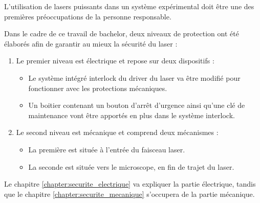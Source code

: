 L'utilisation de lasers puissants dans un système expérimental doit être une des premières préoccupations de la personne responsable.

Dans le cadre de ce travail de bachelor, deux niveaux de protection ont été élaborés afin de garantir au mieux la sécurité du laser :

\begin{enumerate}
    \item Le premier niveau est électrique et repose sur deux dispositifs :
          \begin{itemize}
              \item Le système intégré interlock du driver du laser va être modifié pour fonctionner avec les protections mécaniques.
              \item Un boitier contenant un bouton d'arrêt d'urgence ainsi qu'une clé de maintenance vont être apportés en plus dans le système interlock.
          \end{itemize}
    \item Le second niveau est mécanique et comprend deux mécanismes :
          \begin{itemize}
              \item La première est située à l'entrée du faisceau laser.
              \item La seconde est située vers le microscope, en fin de trajet du laser.
          \end{itemize}
\end{enumerate}

Le chapitre \ref{chapter:securite_electrique} va expliquer la partie électrique, tandis que le chapitre \ref{chapter:securite_mecanique} s'occupera de la partie mécanique.
